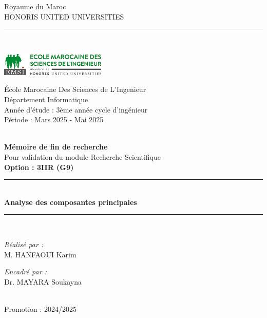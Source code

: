 \documentclass[a4paper,12pt]{report}
\begin{document}
\begin{titlepage}
\centering
{\small Royaume du Maroc}\\
{\small HONORIS UNITED UNIVERSITIES}\\
\rule{\linewidth}{0.3mm} \\[0.4cm]

\begin{minipage}{5cm}
\begin{center}
\includegraphics[width=5cm]{logo1.png}
\end{center}
\end{minipage}\hfill
\begin{minipage}{10cm}
\begin{flushright}
{\small École Marocaine Des Sciences de L'Ingenieur}\\[0.1cm]
{\small Département Informatique}\\[0.1cm]
{\small Année d'étude : 3ème année cycle d'ingénieur}\\[0.1cm]
{\small Période : Mars 2025 - Mai 2025}\\[0.1cm]
\end{flushright}
\end{minipage}\hfill\\
\vspace{20mm}
{\large \bfseries Mémoire de fin de recherche}\\[0.5cm]
{\large Pour validation du module Recherche Scientifique}\\[0.5cm]
{\large \bfseries{Option : 3IIR (G9)} \\ }
\vspace{10mm}
\rule{\linewidth}{0.3mm} \\[0.4cm]
{ \huge \bfseries Analyse des composantes principales\\[0.4cm] }
\rule{\linewidth}{0.3mm} \\[1cm]
\vspace{10mm}

\noindent
\begin{minipage}{0.5\textwidth}
\vspace{-7mm}
\begin{flushleft} \large
\emph{Réalisé par :}\\
M. \textsc{HANFAOUI} Karim \\
\end{flushleft}
\end{minipage}
\begin{minipage}{0.4\textwidth}
\begin{flushright} \large
\emph{Encadré par :} \\
Dr. \textsc{MAYARA} Soukayna \\
\end{flushright}
\end{minipage}\\[1cm]

\vspace{20mm}
{\large Promotion : 2024/2025}
\end{titlepage}
\end{document}
